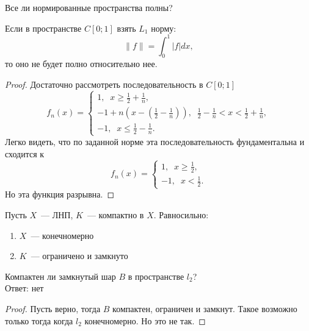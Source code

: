 \begin{counterexample}
    Все ли нормированные пространства полны?

    Если в пространстве $C[0; 1]$ взять $L_1$ норму:
    \[\|f\| = \int_0^1 |f| dx,\]
    то оно не будет полно относительно нее.
\end{counterexample}
\begin{proof}
    Достаточно рассмотреть последовательность в $C[0; 1]$
    \[
    f_n(x) = \begin{cases}
        1,\;\; x \geq \frac{1}{2} + \frac{1}{n},\\
        -1 + n(x-(\frac{1}{2}-\frac{1}{n})),\;\; \frac{1}{2} - \frac{1}{n} < x <  \frac{1}{2} + \frac{1}{n},\\
        -1,\;\; x \leq \frac{1}{2} - \frac{1}{n}.
    \end{cases}
    \]
    Легко видеть, что по заданной норме эта последовательность фундаментальна и сходится к 
    \[
    f_n(x) = \begin{cases}
        1,\;\; x \geq \frac{1}{2},\\
        -1,\;\; x < \frac{1}{2}.
    \end{cases}
    \]
    Но эта функция разрывна.
\end{proof}
\begin{theorem}
    Пусть $X$~--- ЛНП, $K$~--- компактно в $X$. Равносильно:
    \begin{enumerate}
        \item $X$~--- конечномерно
        \item $K$~--- ограничено и замкнуто
    \end{enumerate}
\end{theorem}
\begin{example}
    Компактен ли замкнутый шар $B$ в пространстве $l_2$?\\
    Ответ: нет
\end{example}
\begin{proof}
    Пусть верно, тогда $B$ компактен, ограничен и замкнут. Такое возможно только тогда когда $l_2$ конечномерно. Но это не так.
\end{proof}